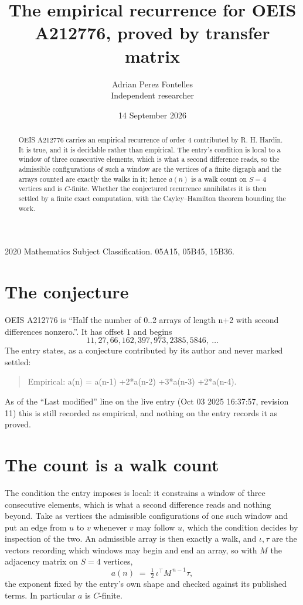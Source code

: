 \documentclass[11pt,a4paper]{article}
\title{The empirical recurrence for OEIS A212776, proved by transfer matrix}
\author{Adrian Perez Fontelles\\ \small Independent researcher}
\date{14 September 2026}
\theoremstyle{plain}
\theoremstyle{definition}
\begin{document}
\maketitle

\begin{abstract}
OEIS A212776 carries an empirical recurrence of order $4$ contributed by R. H. Hardin. It is
true, and it is decidable rather than empirical. The entry's condition is local to a window of three consecutive elements, which is what a second difference reads, so
the admissible configurations of such a window are the vertices of a finite digraph and the
arrays counted are exactly the walks in it; hence $a(n)$ is a walk count on $S=4$ vertices
and is $C$-finite. Whether the conjectured recurrence annihilates it is then settled by a
finite exact computation, with the Cayley--Hamilton theorem bounding the work.
\end{abstract}

\noindent\small 2020 Mathematics Subject Classification. 05A15, 05B45, 15B36.\normalsize

\section{The conjecture}

OEIS A212776 is ``Half the number of 0..2 arrays of length n+2 with second differences nonzero.''. It has offset $1$ and begins
\[
11, 27, 66, 162, 397, 973, 2385, 5846,\ \dots
\]
The entry states, as a conjecture contributed by its author and never marked settled:
\begin{quote}
Empirical: a(n) = a(n-1) +2*a(n-2) +3*a(n-3) +2*a(n-4).
\end{quote}
As of the ``Last modified'' line on the live entry (Oct 03 2025 16:37:57, revision 11) this is still
recorded as empirical, and nothing on the entry records it as proved.

\section{The count is a walk count}

The condition the entry imposes is local: it constrains a window of three consecutive elements, which is what a second difference reads and nothing beyond. Take as vertices the admissible configurations of one such window and put an edge from $u$ to $v$ whenever $v$ may follow $u$, which the condition decides by inspection of the two.
An admissible array is then exactly a walk, and $\iota,\tau$ are the vectors recording which windows may begin and end an array, so with $M$ the adjacency matrix on $S=4$ vertices,
\[
a(n)\;=\;\tfrac{1}{2}\,\iota^{\!\top}M^{\,n-1}\tau ,
\]
the exponent fixed by the entry's own shape and checked against its published terms. In
particular $a$ is $C$-finite.
\end{document}
